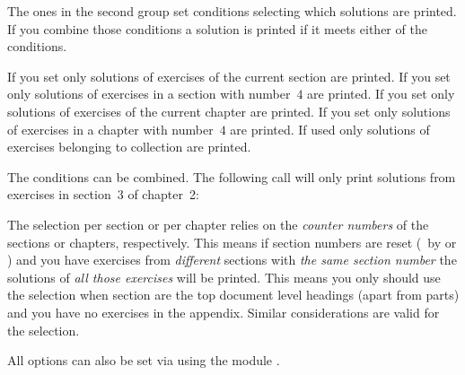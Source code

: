 \documentclass{xsim-manual}
\begin{document}
The ones in the second group set conditions selecting which solutions are
printed.  If you combine those conditions a solution is printed if it meets
either of the conditions.
\begin{options}
    If you set  only solutions of exercises of the
    current section are printed.  If you set  only solutions
    of exercises in a section with number~$4$ are printed.
    If you set  only solutions of exercises of the
    current chapter are printed.  If you set  only solutions
    of exercises in a chapter with number~$4$ are printed.
    If used only solutions of exercises belonging to collection
     are printed.
\end{options}

The conditions can be combined.  The following call will only print solutions
from exercises in section~3 of chapter~2:
\begin{sourcecode}
  \printsolutions[chapter=2,section=3]
\end{sourcecode}

\begin{bewareofthedog}
  The selection per section or per chapter relies on the \emph{counter
    numbers} of the sections or chapters, respectively.  This means if section
  numbers are reset (\eg\ by  or ) and you have
  exercises from \emph{different} sections with \emph{the same section number}
  the solutions of \emph{all those exercises} will be printed.  This means you
  only should use the  selection when section are the top
  document level headings (apart from parts) and you have no exercises in the
  appendix.  Similar considerations are valid for the 
  selection.
\end{bewareofthedog}

All options can also be set via  using the module
.

\begin{example}
  \printsolutions[section=4,headings-template=per-section]
\end{example}

\begin{example}
\end{example}
\end{document}
